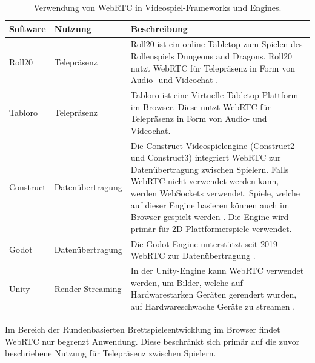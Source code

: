 \addtocounter{footnote}{-2}

\begin{table}[ht]
\centering
\begin{tabularx}{\textwidth}{llX}
\toprule
Software&Nutzung&Beschreibung\\
\midrule
Roll20&Telepräsenz&\glqq{}Roll20\grqq{} ist ein online-Tabletop zum Spielen des Rollenspiels \glqq{}Dungeons and Dragons\grqq{}. Roll20 nutzt WebRTC für Telepräsenz in Form von Audio- und Videochat \cite{roll20}.\\
Tabloro&Telepräsenz&\glqq{}Tabloro\grqq{} ist eine Virtuelle Tabletop-Plattform im Browser. Diese nutzt WebRTC für Telepräsenz in Form von Audio- und Videochat\footnotemark.\\
Construct&Datenübertragung&Die \glqq{}Construct\grqq{} Videospielengine (Construct2 und Construct3) integriert WebRTC zur Datenübertragung zwischen Spielern. Falls WebRTC nicht verwendet werden kann, werden WebSockets verwendet. Spiele, welche auf dieser Engine basieren können auch im Browser gespielt werden \cite{construct}\footnotemark. Die Engine wird primär für 2D-Plattformerspiele verwendet.\\
Godot&Datenübertragung&Die Godot-Engine unterstützt seit 2019 WebRTC zur Datenübertragung \cite{godot}\footnotemark.\\
Unity&Render-Streaming&In der Unity-Engine kann WebRTC verwendet werden, um Bilder, welche auf Hardwarestarken Geräten gerendert wurden, auf Hardwareschwache Geräte zu streamen \cite{unity}.\\
\bottomrule

\end{tabularx}
\caption{Verwendung von WebRTC in Videospiel-Frameworks und Engines.}
\label{table:others}
\end{table}

\newpage

Im Bereich der Rundenbasierten Brettspieleentwicklung im Browser findet WebRTC nur begrenzt Anwendung. Diese beschränkt sich primär auf die zuvor beschriebene Nutzung für Telepräsenz zwischen Spielern.\par



